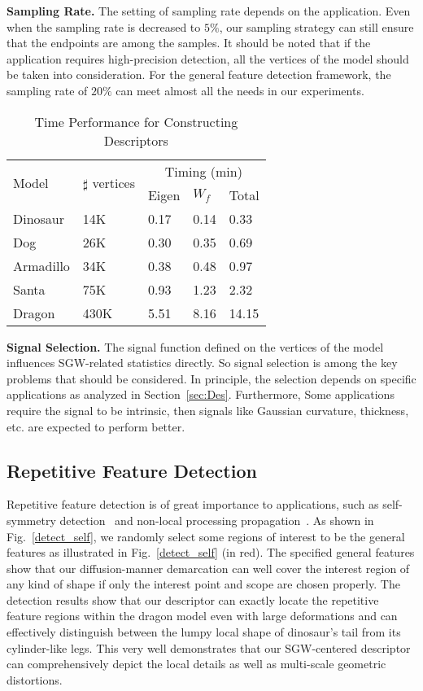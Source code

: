 \textbf{Sampling Rate.} The setting of sampling rate depends on the
application. Even when the sampling rate is decreased
to $5\%$, our sampling strategy can still ensure that the endpoints are
among the samples. It should be noted that if the application requires
high-precision detection, all the vertices of the model should be
taken into consideration. For the general feature detection framework,
the sampling rate of $20\%$ can meet almost all the needs in
our experiments.

\begin{table}
\centering
\caption{Time Performance for Constructing Descriptors}
  \label{table:time}
  \renewcommand{\arraystretch}{1.3}
\begin{tabular}{p{}p{}p{}p{}p{}}
\hline
\multirow{2}{*}{Model} &
\multirow{2}{*}{$\sharp$ vertices} &
\multicolumn{3}{c}{Timing (min)} \\
\cline{3-5}
&\multicolumn{1}{c}{} & Eigen &  $W_f$ & Total\\
\hline
Dinosaur  & 14K & 0.17 & 0.14 & 0.33 \\
Dog       & 26K & 0.30 & 0.35 & 0.69 \\
Armadillo & 34K & 0.38 & 0.48 & 0.97 \\
Santa     & 75K & 0.93 & 1.23 & 2.32\\
Dragon    & 430K & 5.51 & 8.16 & 14.15\\
\hline
\end{tabular}
\end{table}

\textbf{Signal Selection.} The signal function defined on the vertices
of the model influences SGW-related statistics directly. So signal
selection is among the key problems that should be considered. In
principle, the selection depends on specific applications as analyzed
in Section~\ref{sec:Des}. Furthermore, Some applications require the
signal to be intrinsic, then signals like Gaussian curvature, thickness,
etc. are expected to perform better.

\subsection{Repetitive Feature Detection}

Repetitive feature detection is of great importance
to applications, such as self-symmetry detection~\cite{Gal2006} and
non-local processing propagation~\cite{Maximo:2011:RRI:2027471}. As
shown in Fig.~\ref{detect_self}, we randomly select some regions of
interest to be the general features as illustrated in
Fig.~\ref{detect_self} (in red).  The specified general features
show that our diffusion-manner demarcation can well cover the interest
region of any kind of shape if only the interest point and scope are
chosen properly. The detection results show that our
descriptor can exactly locate the repetitive feature regions within
the dragon model even with large deformations and can effectively
distinguish between the lumpy local shape of dinosaur's tail from its
cylinder-like legs. This very well demonstrates that our
SGW-centered descriptor can comprehensively depict the local details
as well as multi-scale geometric distortions.

